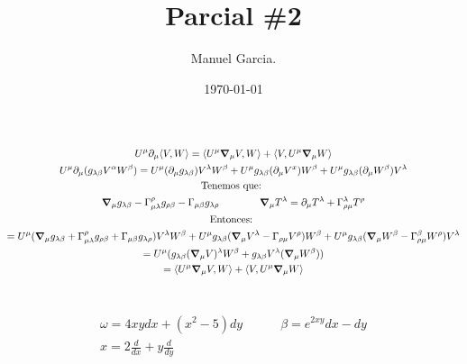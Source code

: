 \documentclass{article}
\title{Parcial \#2 }
\author{Manuel Garcia.}
\date{\today}
\begin{document}
\maketitle

\section{}
\begin{gather}
  U ^ {\mu} \partial _{\mu} \langle V, W \rangle = \langle U ^ {\mu} \grad _{\mu} V, W \rangle + \langle V, U ^ {\mu} \grad _{\mu}  W \rangle \\
  U ^ {\mu } \partial _{\mu} (g _{\lambda \beta} V ^ {\alpha}W ^ {\beta}) = U ^ {\mu} (\partial _{\mu} g _{\lambda\beta} ) V ^ {\lambda} W ^ {\beta} + U ^ {\mu} g _{\lambda\beta} (\partial _{\mu} V ^ {x })W ^ {\beta} + U ^ {\mu} g _{\lambda\beta} (\partial _{\mu} W ^ {\beta})V ^ {\lambda} \\
  \text{Tenemos que: }\\
  \grad _{\mu} g _{\lambda\beta} - \Gamma _{\mu\lambda} ^ {\rho} g _{\rho\beta} - \Gamma _{\mu\beta} g _{\lambda \rho}  \qquad \qquad \grad _{\mu} T ^ {\lambda} = \partial _{\mu} T ^ {\lambda} + \Gamma _{\rho\mu} ^ {\lambda} T ^ {\rho}\\
  \text{Entonces: }\\
  = U ^ {\mu}(\grad _{\mu} g _{\lambda\beta} + \Gamma _{\mu\lambda} ^ {\rho} g _{\rho\beta} + \Gamma _{\mu\beta} g _{\lambda \rho})V ^ {\lambda}W ^ {\beta} + U ^ {\mu}g _{\lambda\beta} (\grad _{\mu} V ^ {\lambda} - \Gamma _{\rho\mu} V ^ {\rho})W ^ {\beta} + U ^ {\mu} g _{\lambda\beta} (\grad _{\mu} W ^ {\beta} - \Gamma _{\rho\mu} ^ {\beta} W ^ {\rho})V ^ {\lambda}\\
  = U ^ {\mu} (g _{\lambda\beta} (\grad _{\mu } V ) ^ {\lambda}W ^ {\beta} + g _{\lambda\beta} V ^ {\lambda} (\grad _{\mu} W ^ {\beta})) \\
  = \langle U ^ {\mu} \grad _{\mu}  V , W \rangle + \langle V, U ^ {\mu} \grad _{\mu} W \rangle
\end{gather}




\section{}
\begin{gather}
  \omega = 4xydx + (x^2 - 5) dy \qquad \quad \beta = e ^ {2xy } dx - dy \\
  x = 2 \frac{d  }{d x } + y \frac{d  }{d y }
\end{gather}
\end{document}

